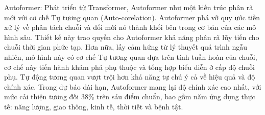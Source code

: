 Autoformer: Phát triển từ Transformer, Autoformer như một kiến trúc phân rã mới với cơ chế Tự tương quan (Auto-corelation). Autoformer phá vỡ quy ước tiền xử lý về phân tách chuỗi và đổi mới nó thành khối bên trong cơ bản của các mô hình sâu. Thiết kế này trao quyền cho Autoformer khả năng phân rã lũy tiến cho chuỗi thời gian phức tạp. Hơn nữa, lấy cảm hứng từ lý thuyết quá trình ngẫu nhiên, mô hình này có cơ chế Tự tương quan dựa trên tính tuần hoàn của chuỗi, cơ chế này tiến hành khám phá phụ thuộc và tổng hợp biểu diễn ở cấp độ chuỗi phụ. Tự động tương quan vượt trội hơn khả năng tự chú ý cả về hiệu quả và độ chính xác. Trong dự báo dài hạn, Autoformer mang lại độ chính xác cao nhất, với mức cải thiện tương đối 38\% trên sáu điểm chuẩn, bao gồm năm ứng dụng thực tế: năng lượng, giao thông, kinh tế, thời tiết và bệnh tật.